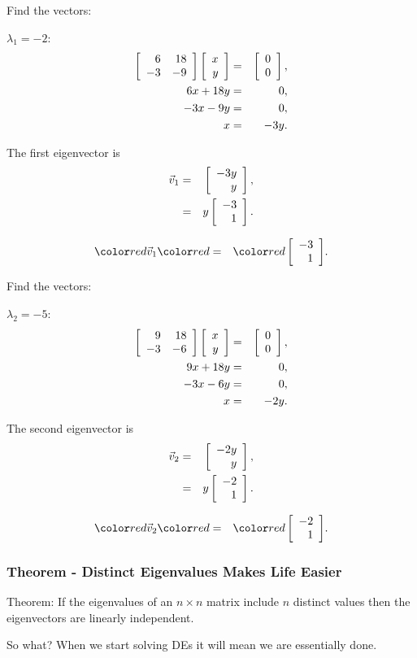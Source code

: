 \begin{frame}
  Find the vectors:

  $\lambda_1 = -2$:
  \begin{eqnarray*}
    \left[ \begin{array}{rr} 6 & 18 \\ -3 & -9 \end{array} \right] \left[ \begin{array}{r} x \\ y \end{array} \right] & = & \left[ \begin{array}{r} 0 \\ 0 \end{array} \right], \\
    6x + 18y & = & 0, \\
    -3x - 9y & = & 0, \\
    x & = & -3y.
  \end{eqnarray*}

  The first eigenvector is 
  \begin{eqnarray*}
    \vec{v}_1 & = & \left[ \begin{array}{r} -3y \\ y \end{array} \right], \\
    & = & y \left[ \begin{array}{r} -3 \\ 1 \end{array} \right].
  \end{eqnarray*}

  \begin{eqnarray*}
    \redText{\vec{v}_1} & \redText{=} & \redText{\vecTwo{-3}{1}}.
  \end{eqnarray*}

\end{frame}

\begin{frame}
  Find the vectors:

  $\lambda_2 = -5$:
  \begin{eqnarray*}
    \left[ \begin{array}{rr} 9 & 18 \\ -3 & -6 \end{array} \right] \left[ \begin{array}{r} x \\ y \end{array} \right] & = & \left[ \begin{array}{r} 0 \\ 0 \end{array} \right], \\
    9x + 18y & = & 0, \\
    -3x - 6y & = & 0, \\
    x & = & -2 y.
  \end{eqnarray*}

  The second eigenvector is 
  \begin{eqnarray*}
    \vec{v}_2 & = & \left[ \begin{array}{r} -2y \\ y \end{array} \right], \\
    & = & y \left[ \begin{array}{r} -2 \\ 1 \end{array} \right].
  \end{eqnarray*}

  \begin{eqnarray*}
    \redText{\vec{v}_2} & \redText{=} & \redText{\vecTwo{-2}{1}}.
  \end{eqnarray*}

\end{frame}



\begin{frame}
  \frametitle{Theorem - Distinct Eigenvalues Makes Life Easier}

  Theorem: If the eigenvalues of an $n\times n$ matrix include $n$
  distinct values then the eigenvectors are linearly independent.

  \vfill

  {
    So what? When we start solving DEs it will mean we are essentially
    done. 
  }

  \vfill

\end{frame}



